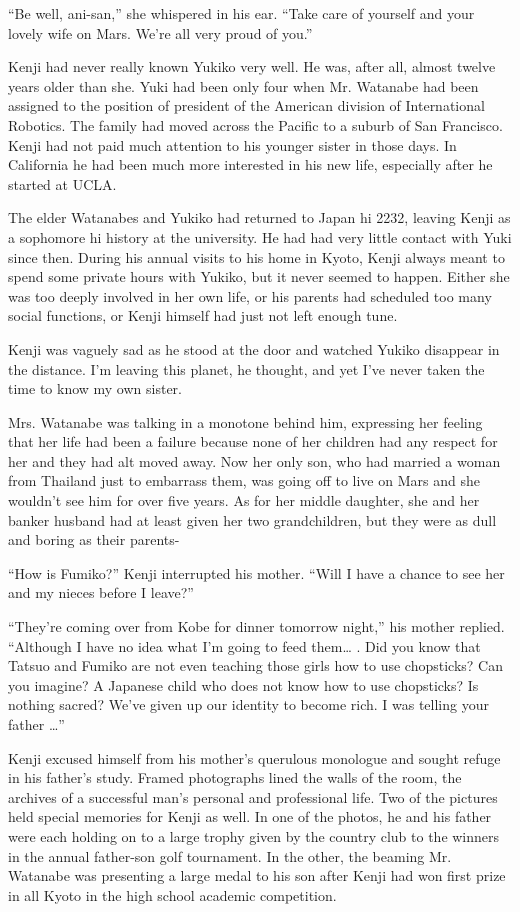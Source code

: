 \documentclass[]{article}
\begin{document}
{“Be well, ani-san,” she whispered in his ear. “Take care of yourself and your lovely wife on Mars. We’re all very proud of you.”

Kenji had never really known Yukiko very well. He was, after all, almost twelve years older than she. Yuki had been only four when Mr. Watanabe had been assigned to the position of president of the American division of International Robotics. The family had moved across the Pacific to a suburb of San Francisco. Kenji had not paid much attention to his younger sister in those days. In California he had been much more interested in his new life, especially after he started at UCLA.

The elder Watanabes and Yukiko had returned to Japan hi 2232, leaving Kenji as a sophomore hi history at the university. He had had very little contact with Yuki since then. During his annual visits to his home in Kyoto, Kenji always meant to spend some private hours with Yukiko, but it never seemed to happen. Either she was too deeply involved in her own life, or his parents had scheduled too many social functions, or Kenji himself had just not left enough tune.

Kenji was vaguely sad as he stood at the door and watched Yukiko disappear in the distance. I’m leaving this planet, he thought, and yet I’ve never taken the time to know my own sister.

Mrs. Watanabe was talking in a monotone behind him, expressing her feeling that her life had been a failure because none of her children had any respect for her and they had alt moved away. Now her only son, who had married a woman from Thailand just to embarrass them, was going off to live on Mars and she wouldn’t see him for over five years. As for her middle daughter, she and her banker husband had at least given her two grandchildren, but they were as dull and boring as their parents-

“How is Fumiko?” Kenji interrupted his mother. “Will I have a chance to see her and my nieces before I leave?”

“They’re coming over from Kobe for dinner tomorrow night,” his mother replied. “Although I have no idea what I’m going to feed them… . Did you know that Tatsuo and Fumiko are not even teaching those girls how to use chopsticks? Can you imagine? A Japanese child who does not know how to use chopsticks? Is nothing sacred? We’ve given up our identity to become rich. I was telling your father …”

Kenji excused himself from his mother’s querulous monologue and sought refuge in his father’s study. Framed photographs lined the walls of the room, the archives of a successful man’s personal and professional life. Two of the pictures held special memories for Kenji as well. In one of the photos, he and his father were each holding on to a large trophy given by the country club to the winners in the annual father-son golf tournament. In the other, the beaming Mr. Watanabe was presenting a large medal to his son after Kenji had won first prize in all Kyoto in the high school academic competition.

}
\end{document}
